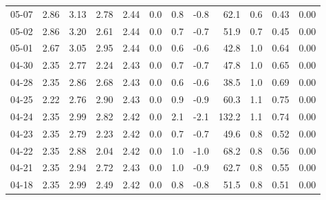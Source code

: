 \begin{threeparttable}
{\begin{tabular}{lrrrrrrrrrrr}
  05-07 &          2.86 &          3.13 &          2.78 &        2.44 &                 0.0 &                 0.8 &       -0.8 &                62.1 &              0.6 &            0.43 &                   0.00 \\
  05-02 &          2.86 &          3.20 &          2.61 &        2.44 &                 0.0 &                 0.7 &       -0.7 &                51.9 &              0.7 &            0.45 &                   0.00 \\
  05-01 &          2.67 &          3.05 &          2.95 &        2.44 &                 0.0 &                 0.6 &       -0.6 &                42.8 &              1.0 &            0.64 &                   0.00 \\
  04-30 &          2.35 &          2.77 &          2.24 &        2.43 &                 0.0 &                 0.7 &       -0.7 &                47.8 &              1.0 &            0.65 &                   0.00 \\
  04-28 &          2.35 &          2.86 &          2.68 &        2.43 &                 0.0 &                 0.6 &       -0.6 &                38.5 &              1.0 &            0.69 &                   0.00 \\
  04-25 &          2.22 &          2.76 &          2.90 &        2.43 &                 0.0 &                 0.9 &       -0.9 &                60.3 &              1.1 &            0.75 &                   0.00 \\
  04-24 &          2.35 &          2.99 &          2.82 &        2.42 &                 0.0 &                 2.1 &       -2.1 &               132.2 &              1.1 &            0.74 &                   0.00 \\
  04-23 &          2.35 &          2.79 &          2.23 &        2.42 &                 0.0 &                 0.7 &       -0.7 &                49.6 &              0.8 &            0.52 &                   0.00 \\
  04-22 &          2.35 &          2.88 &          2.04 &        2.42 &                 0.0 &                 1.0 &       -1.0 &                68.2 &              0.8 &            0.56 &                   0.00 \\
  04-21 &          2.35 &          2.94 &          2.72 &        2.43 &                 0.0 &                 1.0 &       -0.9 &                62.7 &              0.8 &            0.55 &                   0.00 \\
  04-18 &          2.35 &          2.99 &          2.49 &        2.42 &                 0.0 &                 0.8 &       -0.8 &                51.5 &              0.8 &            0.51 &                   0.00 \\

\end{tabular}}
\end{threeparttable}
